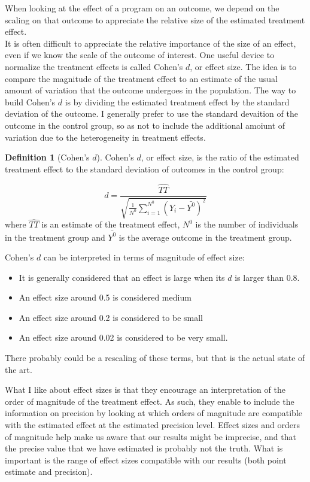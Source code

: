 \documentclass[
]{book}
\providecommand{\tightlist}{%
  \setlength{\itemsep}{0pt}\setlength{\parskip}{0pt}}
\theoremstyle{definition}
\newtheorem{definition}{Definition}[chapter]
\theoremstyle{definition}
\theoremstyle{definition}
\theoremstyle{definition}
\theoremstyle{remark}
\begin{document}
When looking at the effect of a program on an outcome, we depend on the scaling on that outcome to appreciate the relative size of the estimated treatment effect.\\
It is often difficult to appreciate the relative importance of the size of an effect, even if we know the scale of the outcome of interest.
One useful device to normalize the treatment effects is called Cohen's \(d\), or effect size.
The idea is to compare the magnitude of the treatment effect to an estimate of the usual amount of variation that the outcome undergoes in the population.
The way to build Cohen's \(d\) is by dividing the estimated treatment effect by the standard deviation of the outcome.
I generally prefer to use the standard devaition of the outcome in the control group, so as not to include the additional amoiunt of variation due to the heterogeneity in treatment effects.

\begin{definition}[Cohen's $d$]
\protect\hypertarget{def:unnamed-chunk-40}{}{\label{def:unnamed-chunk-40} \iffalse (Cohen's \(d\)) \fi{} }Cohen's \(d\), or effect size, is the ratio of the estimated treatment effect to the standard deviation of outcomes in the control group:
\end{definition}

\[
d = \frac{\hat{TT}}{\sqrt{\frac{1}{N^0}\sum_{i=1}^{N^0}(Y_i-\bar{Y^0})^2}}
\]
where \(\hat{TT}\) is an estimate of the treatment effect, \(N^0\) is the number of individuals in the treatment group and \(\bar{Y^0}\) is the average outcome in the treatment group.

Cohen's \(d\) can be interpreted in terms of magnitude of effect size:

\begin{itemize}
\tightlist
\item
  It is generally considered that an effect is large when its \(d\) is larger than 0.8.
\item
  An effect size around 0.5 is considered medium
\item
  An effect size around 0.2 is considered to be small
\item
  An effect size around 0.02 is considered to be very small.
\end{itemize}

There probably could be a rescaling of these terms, but that is the actual state of the art.

What I like about effect sizes is that they encourage an interpretation of the order of magnitude of the treatment effect.
As such, they enable to include the information on precision by looking at which orders of magnitude are compatible with the estimated effect at the estimated precision level.
Effect sizes and orders of magnitude help make us aware that our results might be imprecise, and that the precise value that we have estimated is probably not the truth.
What is important is the range of effect sizes compatible with our results (both point estimate and precision).
\end{document}
